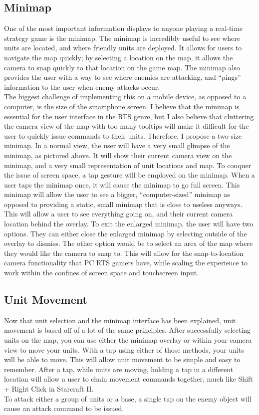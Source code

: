 \documentclass[11pt]{article}
\begin{document}
	\subsection{Minimap}
	One of the most important information displays to anyone playing a real-time strategy game is the minimap. The minimap is incredibly useful to see where units are located, and where friendly units are deployed. It allows for users to navigate the map quickly; by selecting a location on the map, it allows the camera to snap quickly to that location on the game map. The minimap also provides the user with a way to see where enemies are attacking, and ``pings'' information to the user when enemy attacks occur.\\
	The biggest challenge of implementing this on a mobile device, as opposed to a computer, is the size of the smartphone screen. I believe that the minimap is essential for the user interface in the RTS genre, but I also believe that cluttering the camera view of the map with too many tooltips will make it difficult for the user to quickly issue commands to their units. Therefore, I propose a two-size minimap.
	In a normal view, the user will have a very small glimpse of the minimap, as pictured above. It will show their current camera view on the minimap, and a very small representation of unit locations and map. To conquer the issue of screen space, a tap gesture will be employed on the minimap. When a user taps the minimap once, it will cause the minimap to go full screen. This minimap will allow the user to see a bigger, ``computer-sized'' minimap as opposed to providing a static, small minimap that is close to useless anyways. This will allow a user to see everything going on, and their current camera location behind the overlay. To exit the enlarged minimap, the user will have two options. They can either close the enlarged minimap by selecting outside of the overlay to dismiss. The other option would be to select an area of the map where they would like the camera to snap to. This will allow for the snap-to-location camera functionality that PC RTS gamers have, while scaling the experience to work within the confines of screen space and touchscreen input.
	\subsection{Unit Movement}
	Now that unit selection and the minimap interface has been explained, unit movement is based off of a lot of the same principles. After successfully selecting units on the map, you can use either the minimap overlay or within your camera view to move your units. With a tap using either of those methods, your units will be able to move. This will allow unit movement to be simple and easy to remember. After a tap, while units are moving, holding a tap in a different location will allow a user to chain movement commands together, much like Shift + Right Click in Starcraft II.\\
	To attack either a group of units or a base, a single tap on the enemy object will cause an attack command to be issued.
\end{document}
